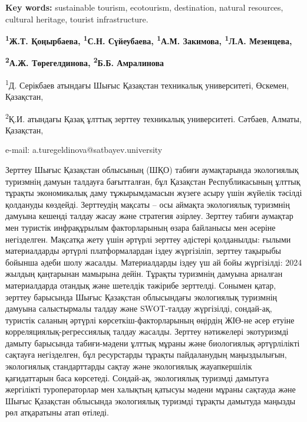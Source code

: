 {\bfseries Key words:} sustainable tourism, ecotourism, destination,
natural resources, cultural heritage, tourist infrastructure.


\begin{center}
{\bfseries \textsuperscript{1}Ж.Т. Қоңырбаева, \textsuperscript{1}С.Н.
Сүйеубаева, \textsuperscript{1}А.М. Закимова, \textsuperscript{1}Л.А.
Мезенцева,}

{\bfseries \textsuperscript{2}А.Ж. Төрегелдинова\envelope,
\textsuperscript{2}Б.Б. Амралинова}

\textsuperscript{1}Д. Серікбаев атындағы Шығыс Қазақстан техникалық
университеті, Өскемен, Қазақстан,

\textsuperscript{2}Қ.И. атындағы Қазақ ұлттық зерттеу техникалық
университеті. Сәтбаев, Алматы, Қазақстан,

e-mail: a.turegeldinova@satbayev.university
\end{center}

Зерттеу Шығыс Қазақстан облысының (ШҚО) табиғи аумақтарында экологиялық
туризмнің дамуын талдауға бағытталған, бұл Қазақстан Республикасының
ұлттық тұрақты экономикалық даму тұжырымдамасын жүзеге асыру үшін
жүйелік тәсілді қолдануды көздейді. Зерттеудің мақсаты -- осы аймақта
экологиялық туризмнің дамуына кешенді талдау жасау және стратегия
әзірлеу. Зерттеу табиғи аумақтар мен туристік инфрақұрылым факторларының
өзара байланысы мен әсеріне негізделген. Мақсатқа жету үшін әртүрлі
зерттеу әдістері қолданылды: ғылыми материалдарды әртүрлі
платформалардан іздеу жүргізіліп, зерттеу тақырыбы бойынша әдеби шолу
жасалды. Материалдарды іздеу үш ай бойы жүргізілді: 2024 жылдың
қаңтарынан мамырына дейін. Тұрақты туризмнің дамуына арналған
материалдарда отандық және шетелдік тәжірибе зерттелді. Сонымен қатар,
зерттеу барысында Шығыс Қазақстан облысындағы экологиялық туризмнің
дамуына салыстырмалы талдау және SWOT-талдау жүргізілді, сондай-ақ,
туристік саланың әртүрлі көрсеткіш-факторларының өңірдің ЖІӨ-не әсер
етуіне корреляциялық-регрессиялық талдау жасалды. Зерттеу нәтижелері
экотуризмді дамыту барысында табиғи-мәдени ұлттық мұраны және
биологиялық әртүрлілікті сақтауға негізделген, бұл ресурстарды тұрақты
пайдаланудың маңыздылығын, экологиялық стандарттарды сақтау және
экологиялық жауапкершілік қағидаттарын баса көрсетеді. Сондай-ақ,
экологиялық туризмді дамытуға жергілікті туроператорлар мен халықтың
қатысуы мәдени мұраны сақтауда және Шығыс Қазақстан облысында
экологиялық туризмді тұрақты дамытуда маңызды рөл атқаратыны атап
өтіледі.

